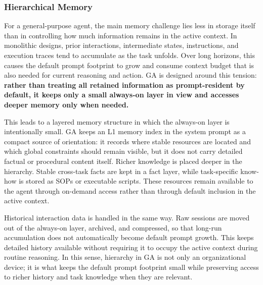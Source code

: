 \subsubsection{Hierarchical Memory}
For a general-purpose agent, the main memory challenge lies less in storage itself than in controlling how much information remains in the active context. In monolithic designs, prior interactions, intermediate states, instructions, and execution traces tend to accumulate as the task unfolds. Over long horizons, this causes the default prompt footprint to grow and consume context budget that is also needed for current reasoning and action. GA is designed around this tension: \textbf{rather than treating all retained information as prompt-resident by default, it keeps only a small always-on layer in view and accesses deeper memory only when needed.}

This leads to a layered memory structure in which the always-on layer is intentionally small. GA keeps an L1 memory index in the system prompt as a compact source of orientation: it records where stable resources are located and which global constraints should remain visible, but it does not carry detailed factual or procedural content itself. Richer knowledge is placed deeper in the hierarchy. Stable cross-task facts are kept in a fact layer, while task-specific know-how is stored as SOPs or executable scripts. These resources remain available to the agent through on-demand access rather than through default inclusion in the active context.

Historical interaction data is handled in the same way. Raw sessions are moved out of the always-on layer, archived, and compressed, so that long-run accumulation does not automatically become default prompt growth. This keeps detailed history available without requiring it to occupy the active context during routine reasoning. In this sense, hierarchy in GA is not only an organizational device; it is what keeps the default prompt footprint small while preserving access to richer history and task knowledge when they are relevant.

